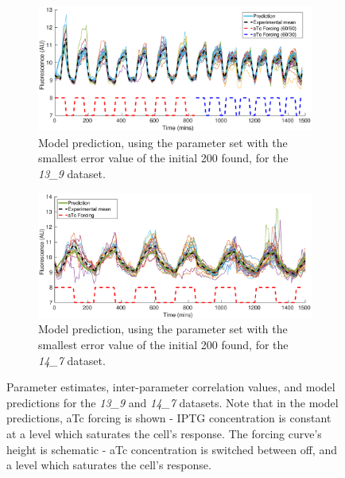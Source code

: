 \documentclass[10pt,journal]{./IEEE_latex_class/IEEEtran}
\begin{document}
\begin{figure}
    \begin{subfigure}[c]{0.49\textwidth}
    \centering
    \includegraphics[scale = 0.26,clip = true, trim = 90 0 70 0]{13_9_bestPlot}
        \caption{Model prediction, using the parameter set with the smallest error value of the initial 200 found, for the \textit{13\_9} dataset.}
                \label{InitialResults_13_9_best}
    \end{subfigure}
    \begin{subfigure}[c]{0.49\textwidth}
    \centering
        \includegraphics[scale = 0.26,clip = true, trim = 90 0 70 0]{14_7_bestPlot}
        \caption{Model prediction, using the parameter set with the smallest error value of the initial 200 found, for the \textit{14\_7} dataset.}
        \label{InitialResults_14_7_best}
    \end{subfigure}
    \caption{Parameter estimates, inter-parameter correlation values, and model predictions for the \textit{13\_9} and \textit{14\_7} datasets. Note that in the model predictions, aTc forcing is shown - IPTG concentration is constant at a level which saturates the cell's response. The forcing curve's height is schematic - aTc concentration is switched between off, and a level which saturates the cell's response.}
\label{InitialResults}
\end{figure} 
 

\end{document}

